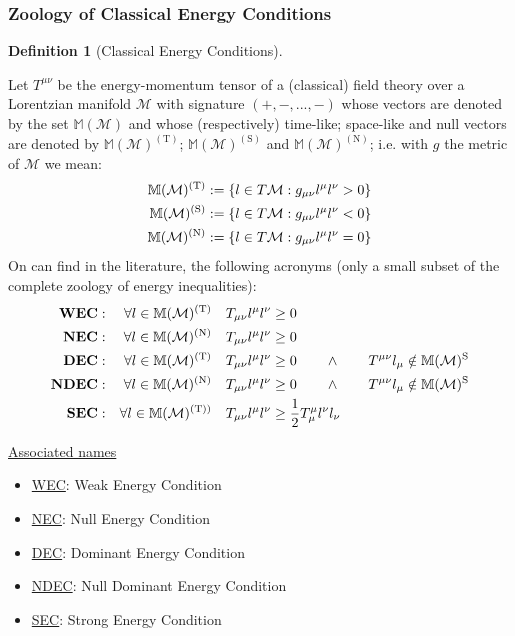 \documentclass[a4paper,11pt]{article}
\numberwithin{equation}{section}
\theoremstyle{definition}
\newtheorem{definition}{Definition}
\begin{document}
\subsubsection{Zoology of Classical Energy Conditions}
\begin{definition}[Classical Energy Conditions]$\quad$

    Let $T^{\mu\nu}$ be the energy-momentum tensor of a (classical) field theory over a Lorentzian manifold $\mathcal{M}$ with signature $(+,-,...,-)$ whose vectors are denoted by the set $\mathbb{M}(\mathcal{M})$ and whose (respectively) time-like; space-like and null vectors are denoted by  $\mathbb{M}(\mathcal{M})^{(\mathrm{T})}$; $\mathbb{M}(\mathcal{M})^{(\mathrm{S})}$ and $\mathbb{M}(\mathcal{M})^{(\mathrm{N})}$; i.e. with $g$ the metric of $\mathcal{M}$ we mean:
    \begin{align}
        \mathbb{M}(\mathcal{M})^{(\mathrm{T})}&:=\left\{l\in T\mathcal{M}:g_{\mu\nu}l^\mu l^\nu>0\right\}\notag\\
        \mathbb{M}(\mathcal{M})^{(\mathrm{S})}&:=\left\{l\in T\mathcal{M}:g_{\mu\nu}l^\mu l^\nu<0\right\}\\
        \mathbb{M}(\mathcal{M})^{(\mathrm{N})}&:=\left\{l\in T\mathcal{M}:g_{\mu\nu}l^\mu l^\nu=0\right\}\notag
    \end{align}
On can find in the literature, the following acronyms (only a small subset of the complete zoology of energy inequalities):
\begin{align}
\textbf{WEC}: && \forall l \in \mathbb{M}(\mathcal{M})^{(\mathrm{T})} && T_{\mu\nu}l^\mu l^\nu\geq \;& 0\notag\\
\textbf{NEC}: && \forall l \in \mathbb{M}(\mathcal{M})^{(\mathrm{N})} && T_{\mu\nu}l^\mu l^\nu\geq \;& 0\notag\\
\textbf{DEC}: && \forall l \in \mathbb{M}(\mathcal{M})^{(\mathrm{T})} && T_{\mu\nu}l^\mu l^\nu\geq \;& 0 \quad \quad \wedge \quad \quad T^{\mu\nu}l_\mu \notin\mathbb{M}(\mathcal{M})^{\mathrm{S}}\\
\textbf{NDEC}: && \forall l \in \mathbb{M}(\mathcal{M})^{(\mathrm{N})} && T_{\mu\nu}l^\mu l^\nu\geq \;& 0 \quad \quad \wedge \quad \quad T^{\mu\nu}l_\mu \notin\mathbb{M}(\mathcal{M})^{\mathrm{S}}\notag\\
\textbf{SEC}: && \forall l \in \mathbb{M}(\mathcal{M})^{(\mathrm{T}))} && T_{\mu\nu}l^\mu l^\nu\geq \;& \frac{1}{2}T^\mu_\mu l^\nu l_\nu\notag
\end{align}
\end{definition}
\underline{Associated names}
\begin{itemize}
    \item \underline{WEC}: Weak Energy Condition
    \item \underline{NEC}: Null Energy Condition
    \item \underline{DEC}: Dominant Energy Condition
    \item \underline{NDEC}: Null Dominant Energy Condition
    \item \underline{SEC}: Strong Energy Condition
\end{itemize}
\end{document}
